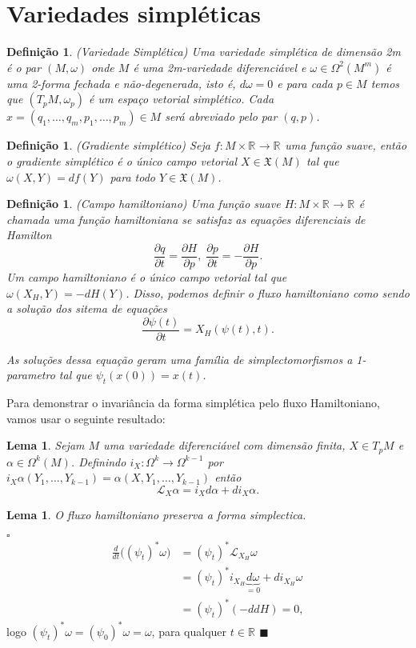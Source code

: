 \documentclass[12pt]{book}
\newtheorem{lema}[teorema]{Lema}
\newtheorem{definicao}[teorema]{Definição}
\newenvironment{prova}[1]{$\square$ #1}{\hfill$\blacksquare$}
\newcommand{\bigparenteses}[1]{\big( #1 \big) }
\newcommand{\derivadaparcial}[2]{\frac{\partial #1}{\partial #2}}
\newcommand{\liederivada}[1]{\mathcal{L}_{#1}}
\newcommand{\real}[1]{\mathbb{R}^{#1}}
\begin{document}
	\section{Variedades simpléticas}
	\begin{definicao}
		(Variedade Simplética) Uma variedade simplética de dimensão 2m é o par $(M, \omega)$ onde $M$ é uma 2m-variedade diferenciável e $\omega \in \Omega^{2}(M^{m})$ é uma 2-forma fechada e não-degenerada, isto é, $d\omega = 0$ e para cada $p \in M$ temos que $(T_{p}M, \omega_{p})$ é um espaço vetorial simplético. Cada $x = (q_{1}, \dots, q_{m}, p_{1}, \dots, p_{m}) \in M$  será abreviado pelo par $(q,p)$.
	\end{definicao}
	
	\begin{definicao}
		(Gradiente simplético) Seja $f : M \times \real{} \to \real{}$ uma função suave, então o gradiente simplético é o único campo vetorial $X \in \mathfrak{X}(M)$ tal que $\omega(X, Y) = df(Y)$ para todo $Y \in \mathfrak{X}(M)$.
	\end{definicao}
	
	\begin{definicao}
		(Campo hamiltoniano) Uma função suave $H : M \times \real{} \to \real{}$ é chamada uma função hamiltoniana se satisfaz as equações diferenciais de Hamilton
		$$
		\frac{\partial q}{\partial t} = \frac{\partial H}{\partial p}, \; \frac{\partial p}{\partial t} = -\frac{\partial H}{\partial p}. 
		$$
		Um campo hamiltoniano é o único campo vetorial tal que $\omega(X_{H}, Y) = -dH(Y)$. Disso, podemos definir o fluxo hamiltoniano como sendo a solução dos sitema de equações 
		$$
		\label{sisHamilt}
		\derivadaparcial{\psi(t)}{t} = X_{H}(\psi(t), t).
		$$
		
		As soluções dessa equação geram uma família de simplectomorfismos a 1-parametro tal que $\psi_{t}(x(0)) = x(t)$.
	\end{definicao}
	Para demonstrar o invariância da forma simplética pelo fluxo Hamiltoniano, vamos usar o seguinte resultado:
	\begin{lema}
		Sejam $M$ uma variedade diferenciável com dimensão finita, $X \in T_{p}M$ e $\alpha \in \Omega^{k}(M)$. Definindo $i_{X}:\Omega^{k} \to \Omega^{k-1}$ por $i_{X}\alpha(Y_{1}, \dots, Y_{k-1}) = \alpha(X, Y_{1}, \dots, Y_{k-1})$ então
		$$
		\liederivada{X}\alpha = i_{X}d\alpha + di_{X}\alpha.
		$$
	\end{lema}
	\begin{lema}
		O fluxo hamiltoniano preserva a forma simplectica.
	\end{lema}
	\begin{prova}\label{fluxo_convervativo}
			$$
			\begin{aligned}
			\frac{d}{dt}\bigparenteses{(\psi_{t})^{*}\omega} 
			&= (\psi_{t})^{*} \liederivada{X_{H}}\omega  
			\\
			&= (\psi_{t})^{*} i_{X_{H}}\underbrace{d\omega }_ {=0}+ di_{X_{H}}\omega 
			\\
			&= (\psi_{t})^{*} (-ddH)=0,
			\end{aligned}
			$$
			logo $(\psi_{t})^{*} \omega = (\psi_{0})^{*} \omega = \omega$, para qualquer $t \in \real{}$
	\end{prova}
	
\end{document}
